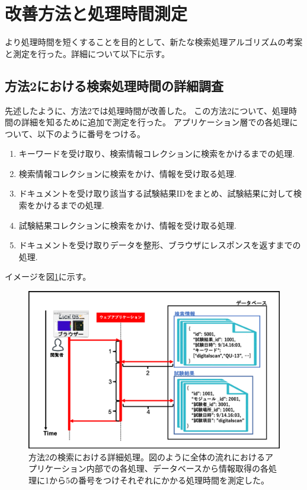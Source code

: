 
\clearpage
\section{改善方法と処理時間測定}
より処理時間を短くすることを目的として、新たな検索処理アルゴリズムの考案と測定を行った。詳細について以下に示す。

\subsection{方法2における検索処理時間の詳細調査}
先述したように、方法2では処理時間が改善した。
この方法2について、処理時間の詳細を知るために追加で測定を行った。
アプリケーション層での各処理について、以下のように番号をつける。
\begin{enumerate}
  \item キーワードを受け取り、検索情報コレクションに検索をかけるまでの処理.
  \item 検索情報コレクションに検索をかけ、情報を受け取る処理.
  \item ドキュメントを受け取り該当する試験結果IDをまとめ、試験結果に対して検索をかけるまでの処理.
  \item 試験結果コレクションに検索をかけ、情報を受け取る処理.
  \item ドキュメントを受け取りデータを整形、ブラウザにレスポンスを返すまでの処理.
\end{enumerate}

イメージを図\ref{search_mongo_collection_details}に示す。

\begin{figure}[bpt]
  \begin{center}
    \includegraphics[width=12cm]{./search_mongo_collection_details.png}
  \caption[方法2の検索における詳細処理]{方法2の検索における詳細処理。図のように全体の流れにおけるアプリケーション内部での各処理、データベースから情報取得の各処理に1から5の番号をつけそれぞれにかかる処理時間を測定した。}
  \label{search_mongo_collection_details}
  \end{center}
\end{figure}

